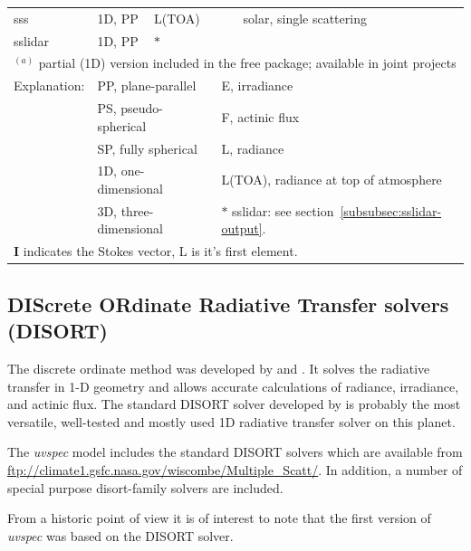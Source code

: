 \begin{table}[htbp]
\begin{tabularx}{1.0\hsize}{lp{1.5cm}lp{4cm}X}
    sss        & 1D, PP & L(TOA)          &                      & solar, single scattering \\
    sslidar    & 1D, PP & $\ast$          &                      & \\
    \hline
    \multicolumn{5}{l}{$^{(a)}$ partial (1D) version included in the free package; available in joint projects}\\
    Explanation: & \multicolumn{2}{l}{PP, plane-parallel}    & \multicolumn{2}{l}{E, irradiance}   \\
    & \multicolumn{2}{l}{PS, pseudo-spherical}  & \multicolumn{2}{l}{F, actinic flux} \\
    & \multicolumn{2}{l}{SP, fully spherical}   & \multicolumn{2}{l}{L, radiance}    \\
 & \multicolumn{2}{l}{1D, one-dimensional}   &
      \multicolumn{2}{l}{L(TOA), radiance at top of atmosphere}   \\
    & \multicolumn{2}{l}{3D, three-dimensional} & \multicolumn{2}{l}{$\ast$ sslidar: see section~\ref{subsubsec:sslidar-output}.} \\
    \multicolumn{5}{l}{{\bf I} indicates the Stokes vector, L is it's
      first element.}\\
  \end{tabularx}
\end{table} 

\subsection{DIScrete ORdinate Radiative Transfer solvers (DISORT)}
The discrete ordinate method was developed by \citet{chand60}
and \citet{Stamnes1988c}.  It solves the radiative transfer
in 1-D geometry and allows accurate calculations of radiance,
irradiance, and actinic flux. The standard DISORT solver developed 
by \citet{Stamnes1988c,stamnes2000} is probably the most versatile, well-tested
and mostly used 1D radiative transfer solver on this planet.

The {\sl uvspec} model includes the standard
DISORT solvers which are available from
\url{ftp://climate1.gsfc.nasa.gov/wiscombe/Multiple_Scatt/}. In
addition, a number of special purpose disort-family solvers are included.

From a historic point of view it is of interest to note that the
first version of {\sl uvspec} was based on the DISORT solver.

